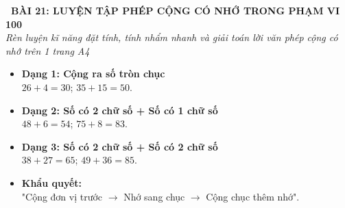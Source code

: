 \documentclass[11pt,a4paper]{article}
\begin{document}
\begin{tcolorbox}[
  enhanced,
  colback=violet!8!white,
  colframe=violet!70!black,
  arc=3mm, boxrule=1.2pt,
  left=3mm, right=3mm, top=2mm, bottom=2mm,
  halign=center
]
  {\LARGE\bfseries\color{violet!90!black}\faBookmark\ BÀI 21: LUYỆN TẬP PHÉP CỘNG CÓ NHỚ TRONG PHẠM VI 100}\\[1mm]
  {\itshape\footnotesize\color{black!75} Rèn luyện kĩ năng đặt tính, tính nhẩm nhanh và giải toán lời văn phép cộng có nhớ trên 1 trang A4}
\end{tcolorbox}

\vspace{-2mm}

\noindent
\begin{minipage}[t]{0.49\textwidth}\vspace{0pt}
\begin{tcolorbox}[
  enhanced,
  colback=violet!4!white,
  colframe=violet!75!black,
  arc=2mm, boxrule=0.8pt,
  left=2mm, right=2mm, top=1.8mm, bottom=1.8mm,
  title={\footnotesize\bfseries\color{white}\faKey\ 1. Tổng hợp các dạng phép cộng có nhớ}
]
{\footnotesize
\begin{itemize}\setlength{\itemsep}{1pt}\setlength{\leftskip}{-2.5mm}
  \item \textbf{Dạng 1: Cộng ra số tròn chục}\\
  $26 + 4 = 30$; $35 + 15 = 50$.
  \item \textbf{Dạng 2: Số có 2 chữ số + Số có 1 chữ số}\\
  $48 + 6 = 54$; $75 + 8 = 83$.
  \item \textbf{Dạng 3: Số có 2 chữ số + Số có 2 chữ số}\\
  $38 + 27 = 65$; $49 + 36 = 85$.
  \item \textbf{Khẩu quyết:}\\
  "Cộng đơn vị trước $\to$ Nhớ sang chục $\to$ Cộng chục thêm nhớ".
\end{itemize}
}
\end{tcolorbox}
\end{minipage}
\hfill
\end{document}
